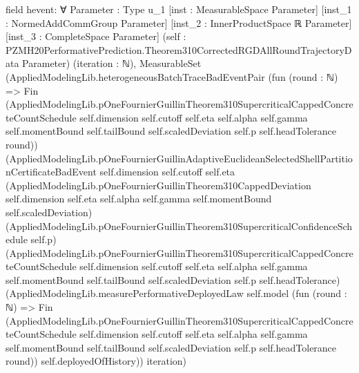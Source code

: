\documentclass[10pt]{article}
\begin{document}
\begin{ReviewVerbatim}
field hevent:
∀ {Parameter : Type u_1} [inst : MeasurableSpace Parameter] [inst_1 : NormedAddCommGroup Parameter]
  [inst_2 : InnerProductSpace ℝ Parameter] [inst_3 : CompleteSpace Parameter]
  (self : PZMH20PerformativePrediction.Theorem310CorrectedRGDAllRoundTrajectoryData Parameter) (iteration : ℕ),
  MeasurableSet
    (AppliedModelingLib.heterogeneousBatchTraceBadEventPair
      (fun (round : ℕ) =>
        Fin
          (AppliedModelingLib.pOneFournierGuillinTheorem310SupercriticalCappedConcreteCountSchedule self.dimension
            self.cutoff self.eta self.alpha self.gamma self.momentBound self.tailBound self.scaledDeviation self.p
            self.headTolerance round))
      (AppliedModelingLib.pOneFournierGuillinAdaptiveEuclideanSelectedShellPartitionCertificateBadEvent self.dimension
        self.cutoff self.eta
        (AppliedModelingLib.pOneFournierGuillinTheorem310CappedDeviation self.dimension self.eta self.alpha self.gamma
          self.momentBound self.scaledDeviation)
        (AppliedModelingLib.pOneFournierGuillinTheorem310SupercriticalConfidenceSchedule self.p)
        (AppliedModelingLib.pOneFournierGuillinTheorem310SupercriticalCappedConcreteCountSchedule self.dimension
          self.cutoff self.eta self.alpha self.gamma self.momentBound self.tailBound self.scaledDeviation self.p
          self.headTolerance)
        (AppliedModelingLib.measurePerformativeDeployedLaw self.model
          (fun (round : ℕ) =>
            Fin
              (AppliedModelingLib.pOneFournierGuillinTheorem310SupercriticalCappedConcreteCountSchedule self.dimension
                self.cutoff self.eta self.alpha self.gamma self.momentBound self.tailBound self.scaledDeviation self.p
                self.headTolerance round))
          self.deployedOfHistory))
      iteration)
\end{ReviewVerbatim}
\end{document}
